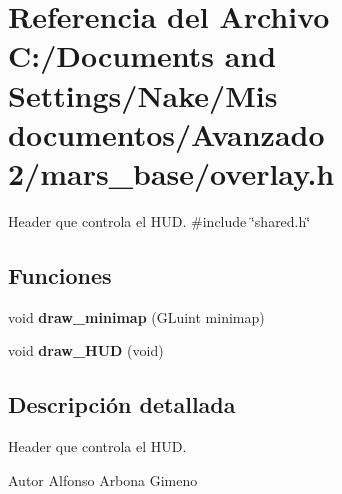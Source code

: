 \section{Referencia del Archivo C:/Documents and Settings/Nake/Mis documentos/Avanzado 2/mars\_\-base/overlay.h}
\label{overlay_8h}


Header que controla el HUD.  
{\ttfamily \#include \char`\"{}shared.h\char`\"{}}\par
\subsection*{Funciones}
\begin{DoxyCompactItemize}
\item 
void {\bfseries draw\_\-minimap} (GLuint minimap)\label{overlay_8h_acee6eec211829d1a95c5e77b61f84885}

\item 
void {\bfseries draw\_\-HUD} (void)\label{overlay_8h_a5aaa9b14296618d040f503e8cdcc029e}

\end{DoxyCompactItemize}


\subsection{Descripción detallada}
Header que controla el HUD. \begin{DoxyAuthor}{Autor}
Alfonso Arbona Gimeno 
\end{DoxyAuthor}
